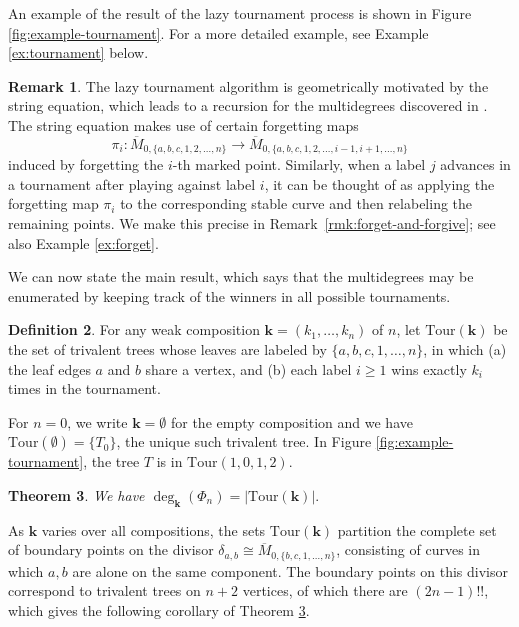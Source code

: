 \documentclass[11pt]{amsart}
\newcommand{\Mbar}{\overline{M}}
\newcommand{\emb}{\Phi}
\newcommand{\Tour}{\mathrm{Tour}}
\newtheorem{thm}{Theorem}
\numberwithin{thm}{section}
\numberwithin{equation}{section}
\numberwithin{figure}{section}
\theoremstyle{definition}
\newtheorem{definition}[thm]{Definition}
\newtheorem{remark}[thm]{Remark}
\begin{document}
An example of the result of the lazy tournament process is shown in Figure \ref{fig:example-tournament}.  For a more detailed example, see Example \ref{ex:tournament} below.

\begin{remark}
The lazy tournament algorithm is geometrically motivated by the string equation, which leads to a recursion for the multidegrees discovered in \cite{CGM}. The string equation makes use of certain forgetting maps $$\pi_i:\Mbar_{0,\{a,b,c,1,2,\ldots,n\}}\to \Mbar_{0,\{a,b,c,1,2,\ldots,i-1,i+1,\ldots,n\}}$$ induced by forgetting the $i$-th marked point.  Similarly, when a label $j$ advances in a tournament after playing against label $i$, it can be thought of as applying the forgetting map $\pi_i$ to the corresponding stable curve and then relabeling the remaining points. We make this precise in Remark~\ref{rmk:forget-and-forgive}; see also Example \ref{ex:forget}. \end{remark}

We can now state the main result, which says that the multidegrees may be enumerated by keeping track of the winners in all possible tournaments.


\begin{definition}\label{def:tour}
For any weak composition $\mathbf{k} = (k_1,\dots, k_n)$ of $n$, let $\Tour(\mathbf{k})$ be the set of trivalent trees whose leaves are labeled by $\{a,b,c,1,\dots, n\}$, in which (a) the leaf edges $a$ and $b$ share a vertex, and (b) each label $i\geq 1$ wins exactly $k_i$ times in the tournament.
\end{definition}

For $n=0$, we write $\mathbf{k} = \emptyset$ for the empty composition and we have $\Tour(\emptyset) = \{T_0\}$, the unique such trivalent tree. In Figure \ref{fig:example-tournament}, the tree $T$ is in $\Tour(1, 0, 1, 2)$.

\begin{thm}\label{thm:tournaments}
 We have $\deg_{\mathbf{k}}(\emb_n)=|\Tour(\mathbf{k})|.$
\end{thm}

As $\mathbf{k}$ varies over all compositions, the sets $\Tour(\mathbf{k})$ partition the complete set of boundary points on the divisor $\delta_{a,b} \cong \Mbar_{0, \{b, c, 1, \ldots, n\}}$, consisting of curves in which $a, b$ are alone on the same component. The boundary points on this divisor correspond to trivalent trees on $n+2$ vertices, of which there are $(2n-1)!!$, which gives the following corollary of Theorem \ref{thm:tournaments}.
\end{document}
